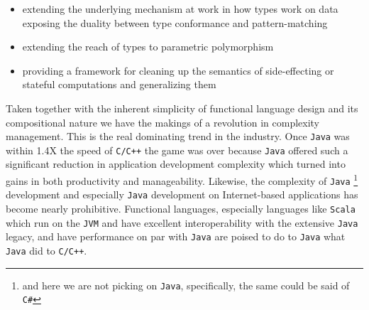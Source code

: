 \begin{itemize}
  \item extending the underlying mechanism at work in how types work on
  data exposing the duality between type conformance and
  pattern-matching
  \item extending the reach of types to parametric polymorphism
  \item providing a framework for cleaning up the semantics of
    side-effecting or stateful computations and generalizing them
\end{itemize}

Taken together with the inherent simplicity of functional language
design and its compositional nature we have the makings of a
revolution in complexity management. This is the real dominating trend
in the industry. Once \texttt{Java} was within 1.4X the speed of
\texttt{C/C++} the game was over because \texttt{Java} offered such a
significant reduction in application development complexity which
turned into gains in both productivity and manageability. Likewise,
the complexity of \texttt{Java} \footnote{and here we are not picking
  on \texttt{Java}, specifically, the same could be said of
  \texttt{C\#}} development and especially \texttt{Java} development
on Internet-based applications has become nearly
prohibitive. Functional languages, especially languages like
\texttt{Scala} which run on the \texttt{JVM} and have excellent
interoperability with the extensive \texttt{Java} legacy, and have
performance on par with \texttt{Java} are poised to do to
\texttt{Java} what \texttt{Java} did to \texttt{C/C++}.
